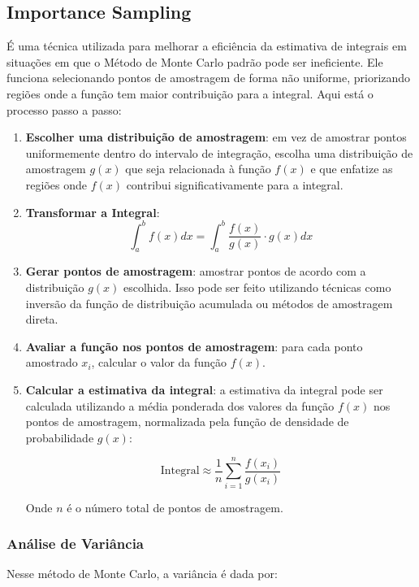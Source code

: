 \documentclass{article}
\begin{document}
\subsection{Importance Sampling}

É uma técnica utilizada para melhorar a eficiência da estimativa de integrais em situações em que o Método de Monte Carlo padrão pode ser ineficiente. Ele funciona selecionando pontos de amostragem de forma não uniforme, priorizando regiões onde a função tem maior contribuição para a integral. Aqui está o processo passo a passo:

\begin{enumerate}
  \item \textbf{Escolher uma distribuição de amostragem}: em vez de amostrar pontos uniformemente dentro do intervalo de integração, escolha uma distribuição de amostragem $g(x)$ que seja relacionada à função $f(x)$ e que enfatize as regiões onde $f(x)$ contribui significativamente para a integral.

  \item \textbf{Transformar a Integral}:
  \[
  \text{$\int_a^b f(x) dx = \int_a^b \frac{f(x)}{g(x)}\cdot g(x)  dx$}
  \]
  
  \item \textbf{Gerar pontos de amostragem}: amostrar pontos de acordo com a distribuição $g(x)$ escolhida. Isso pode ser feito utilizando técnicas como inversão da função de distribuição acumulada ou métodos de amostragem direta.
  
  \item \textbf{Avaliar a função nos pontos de amostragem}: para cada ponto amostrado $x_i$, calcular o valor da função $f(x)$.
  
  \item \textbf{Calcular a estimativa da integral}: a estimativa da integral pode ser calculada utilizando a média ponderada dos valores da função $f(x)$ nos pontos de amostragem, normalizada pela função de densidade de probabilidade $g(x)$:
  
  \[
  \text{Integral} \approx \frac{1}{n} \sum_{i=1}^{n} \frac{f(x_i)}{g(x_i)}
  \]
  
  Onde $n$ é o número total de pontos de amostragem.
\end{enumerate}

\subsubsection{Análise de Variância}
Nesse método de Monte Carlo, a variância é dada por:
\end{document}
